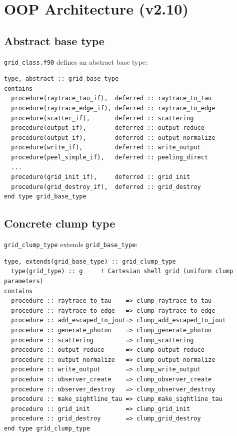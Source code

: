 \documentclass[english,a4paper]{my_memo}
\begin{document}
\section{OOP Architecture (v2.10)}
\label{sec:oop}

\subsection{Abstract base type}

\texttt{grid\_class.f90} defines an abstract base type:
\begin{lstlisting}
type, abstract :: grid_base_type
contains
  procedure(raytrace_tau_if),  deferred :: raytrace_to_tau
  procedure(raytrace_edge_if), deferred :: raytrace_to_edge
  procedure(scatter_if),       deferred :: scattering
  procedure(output_if),        deferred :: output_reduce
  procedure(output_if),        deferred :: output_normalize
  procedure(write_if),         deferred :: write_output
  procedure(peel_simple_if),   deferred :: peeling_direct
  ...
  procedure(grid_init_if),     deferred :: grid_init
  procedure(grid_destroy_if),  deferred :: grid_destroy
end type grid_base_type
\end{lstlisting}

\subsection{Concrete clump type}

\texttt{grid\_clump\_type} extends \texttt{grid\_base\_type}:
\begin{lstlisting}
type, extends(grid_base_type) :: grid_clump_type
  type(grid_type) :: g     ! Cartesian shell grid (uniform clump parameters)
contains
  procedure :: raytrace_to_tau    => clump_raytrace_to_tau
  procedure :: raytrace_to_edge   => clump_raytrace_to_edge
  procedure :: add_escaped_to_jout=> clump_add_escaped_to_jout
  procedure :: generate_photon    => clump_generate_photon
  procedure :: scattering         => clump_scattering
  procedure :: output_reduce      => clump_output_reduce
  procedure :: output_normalize   => clump_output_normalize
  procedure :: write_output       => clump_write_output
  procedure :: observer_create    => clump_observer_create
  procedure :: observer_destroy   => clump_observer_destroy
  procedure :: make_sightline_tau => clump_make_sightline_tau
  procedure :: grid_init          => clump_grid_init
  procedure :: grid_destroy       => clump_grid_destroy
end type grid_clump_type
\end{lstlisting}
\end{document}
